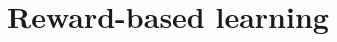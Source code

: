 \documentclass{beamer}
\begin{document}

\section{Reward-based learning}
\subsection*{}
\end{document}
